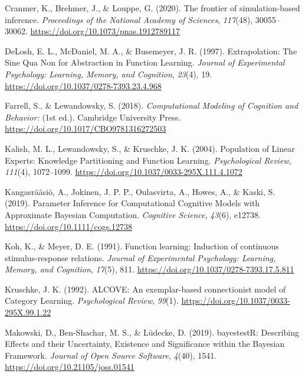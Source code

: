 \documentclass[
  letterpaper,
  DIV=11,
  numbers=noendperiod,
  oneside]{scrartcl}
\newlength{\cslhangindent}
\newenvironment{CSLReferences}[2] %
 {\begin{list}{}{%
  \setlength{\itemindent}{0pt}
  \setlength{\leftmargin}{0pt}
  \setlength{\parsep}{0pt}
  \ifodd #1
   \setlength{\leftmargin}{\cslhangindent}
   \setlength{\itemindent}{-1\cslhangindent}
  \fi
  \setlength{\itemsep}{#2\baselineskip}}}
 {\end{list}}
\begin{document}
\begin{CSLReferences}{1}{0}
Cranmer, K., Brehmer, J., \& Louppe, G. (2020). The frontier of
simulation-based inference. \emph{Proceedings of the National Academy of
Sciences}, \emph{117}(48), 30055--30062.
\url{https://doi.org/10.1073/pnas.1912789117}

DeLosh, E. L., McDaniel, M. A., \& Busemeyer, J. R. (1997).
Extrapolation: {The Sine Qua Non} for {Abstraction} in {Function
Learning}. \emph{Journal of Experimental Psychology: Learning, Memory,
and Cognition}, \emph{23}(4), 19.
\url{https://doi.org/10.1037/0278-7393.23.4.968}

Farrell, S., \& Lewandowsky, S. (2018). \emph{Computational {Modeling}
of {Cognition} and {Behavior}:} (1st ed.). {Cambridge University Press}.
\url{https://doi.org/10.1017/CBO9781316272503}

Kalish, M. L., Lewandowsky, S., \& Kruschke, J. K. (2004). Population of
{Linear Experts}: {Knowledge Partitioning} and {Function Learning}.
\emph{Psychological Review}, \emph{111}(4), 1072--1099.
\url{https://doi.org/10.1037/0033-295X.111.4.1072}

Kangasrääsiö, A., Jokinen, J. P. P., Oulasvirta, A., Howes, A., \&
Kaski, S. (2019). Parameter {Inference} for {Computational Cognitive
Models} with {Approximate Bayesian Computation}. \emph{Cognitive
Science}, \emph{43}(6), e12738. \url{https://doi.org/10.1111/cogs.12738}

Koh, K., \& Meyer, D. E. (1991). Function learning: {Induction} of
continuous stimulus-response relations. \emph{Journal of Experimental
Psychology: Learning, Memory, and Cognition}, \emph{17}(5), 811.
\url{https://doi.org/10.1037/0278-7393.17.5.811}

Kruschke, J. K. (1992). {ALCOVE}: {An} exemplar-based connectionist
model of {Category Learning}. \emph{Psychological Review}, \emph{99}(1).
\url{https://doi.org/10.1037/0033-295X.99.1.22}

Makowski, D., Ben-Shachar, M. S., \& Lüdecke, D. (2019). {bayestestR}:
{Describing Effects} and their {Uncertainty}, {Existence} and
{Significance} within the {Bayesian Framework}. \emph{Journal of Open
Source Software}, \emph{4}(40), 1541.
\url{https://doi.org/10.21105/joss.01541}


\end{CSLReferences}
\end{document}
